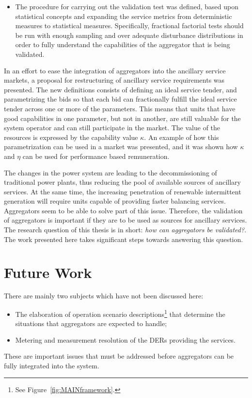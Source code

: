 \begin{description}
\begin{itemize}
			\item The procedure for carrying out the validation test was defined, based upon statistical concepts and expanding the service metrics from deterministic measures to statistical measures. Specifically, fractional factorial tests should be run with enough sampling and over adequate disturbance distributions in order to fully understand the capabilities of the aggregator that is being validated.
		\end{itemize}
\end{description}

In an effort to ease the integration of aggregators into the ancillary service markets, a proposal for restructuring of ancillary service requirements was presented. The new definitions consists of defining an ideal service tender, and parametrizing the bids so that each bid can fractionally fulfill the ideal service tender across one or more of the parameters. This means that units that have good capabilities in one parameter, but not in another, are still valuable for the system operator and can still participate in the market. The value of the resources is expressed by the capability value $\kappa$. An example of how this parametrization can be used in a market was presented, and it was shown how $\kappa$ and $\eta$ can be used for performance based remuneration.

The changes in the power system are leading to the decommissioning of traditional power plants, thus reducing the pool of available sources of ancillary services. At the same time, the increasing penetration of renewable intermittent generation will require units capable of providing faster balancing services. Aggregators seem to be able to solve part of this issue. Therefore, the validation of aggregators is important if they are to be used as sources for ancillary services. The research question of this thesis is in short: \emph{how can aggregators be validated?}. The work presented here takes significant steps towards answering this question.

\section{Future Work} %
\label{sec:FutureWork}
There are mainly two subjects which have not been discussed here:
\begin{itemize}
	\item The elaboration of operation scenario descriptions\footnote{See Figure~\ref{fig:MAINframework}.} that determine the situations that aggregators are expected to handle;
	\item Metering and measurement resolution of the DERs providing the services. 
\end{itemize}
These are important issues that must be addressed before aggregators can be fully integrated into the system. 


